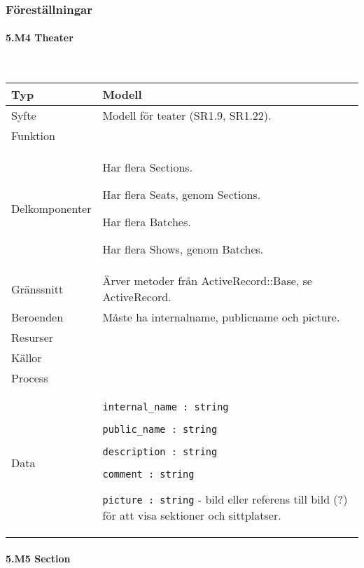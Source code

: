 \documentclass[a4paper, twoside, 11pt, titlepage]{article}
\begin{document}
		\subsubsection{Föreställningar}



			\paragraph{5.M4 Theater}\

			\begin {table} [ht] \begin{tabular} {  p{3.5cm} p{9.6cm} }
				\hline
				{Typ} & {Modell} \\
				\hline
				{Syfte} & {Modell för teater (SR1.9, SR1.22).} \\
				\hline
				{Funktion} & { } \\
				\hline
				{Delkomponenter} & {Har flera Sections.

Har flera Seats, genom Sections.

Har flera Batches.

Har flera Shows, genom Batches.} \\
				\hline
				{Gränssnitt} & {Ärver metoder från ActiveRecord::Base, se ActiveRecord.} \\
				\hline
				{Beroenden} & {Måste ha internalname, publicname och picture.} \\
				\hline
				{Resurser} & { } \\
				\hline
				{Källor} & { } \\
				\hline
				{Process} & { } \\
				\hline
				{Data} & {{\tt internal\_name : string}

{\tt public\_name : string}

{\tt description : string}

{\tt comment : string}

{\tt picture : string} - bild eller referens till bild (?) för att visa sektioner och sittplatser.} \\
				\hline
			\end{tabular} \end{table} \FloatBarrier


			\paragraph{5.M5 Section}\
\end{document}

